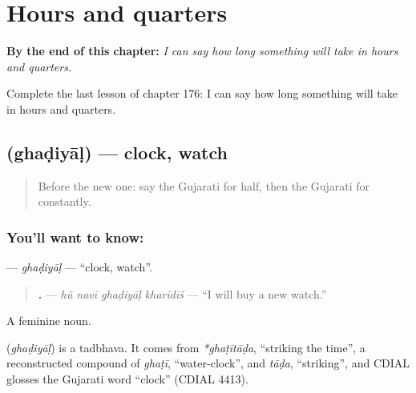 
\chapter{Hours and quarters}
\label{ch:gu-hours-and-quarters}

\begin{chapteropening}
\textbf{By the end of this chapter:} \emph{I can say how long something will take in hours and quarters.}

Complete the last lesson of chapter 176: I can say how long something will take in hours and quarters.
\end{chapteropening}

\section[\texorpdfstring{\gu{ઘડિયાળ} (ghaḍiyāḷ)}{ઘડિયાળ (ghaḍiyāḷ)}]{ (ghaḍiyāḷ) — clock, watch}

\label{lesson:GU-C176-ghadiyal}



\begin{quote}
Before the new one: say the Gujarati for half, then the Gujarati for constantly.
\end{quote}

\subsection*{You'll want to know: }
\textbf{} — \emph{ghaḍiyāḷ} — \textquotedblleft{}clock, watch\textquotedblright{}.

\begin{quote}
\textbf{   .} — \emph{hũ navī ghaḍiyāḷ kharīdīś} — \textquotedblleft{}I will buy a new watch.\textquotedblright{}
\end{quote}

A feminine noun.

\begin{cousinweb}
\textbf{} (\emph{ghaḍiyāḷ}) is a tadbhava. It comes from \emph{*ghaṭītāḍa}, \textquotedblleft{}striking the time\textquotedblright{}, a reconstructed compound of \emph{ghaṭī}, \textquotedblleft{}water-clock\textquotedblright{}, and \emph{tāḍa}, \textquotedblleft{}striking\textquotedblright{}, and CDIAL glosses the Gujarati word \textquotedblleft{}clock\textquotedblright{} (CDIAL 4413).
\end{cousinweb}

